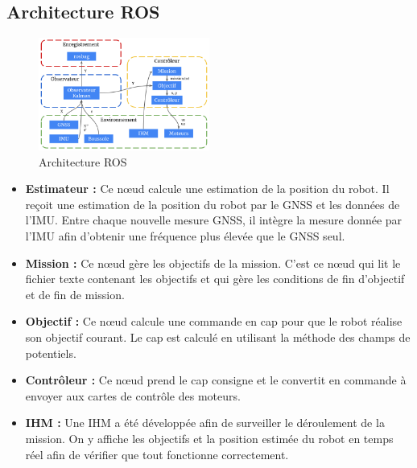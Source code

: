 \subsection{Architecture ROS}

\begin{figure}[H]
    \centering\includegraphics[width=0.5\textwidth]{images/ugv/arch_ros.png}
    \caption{Architecture ROS}
\end{figure}

\begin{itemize}
    \item \textbf{Estimateur :}
    Ce nœud calcule une estimation de la position du robot. Il reçoit une estimation de la position du robot par le GNSS et les données de l’IMU. Entre chaque nouvelle mesure GNSS, il intègre la mesure donnée par l’IMU afin d’obtenir une fréquence plus élevée que le GNSS seul.
    \\
    \item \textbf{Mission :}
    Ce nœud gère les objectifs de la mission. C’est ce nœud qui lit le fichier texte contenant les objectifs et qui gère les conditions de fin d’objectif et de fin de mission.
    \\
    \item \textbf{Objectif :}
    Ce nœud calcule une commande en cap pour que le robot réalise son objectif courant. Le cap est calculé en utilisant la méthode des champs de potentiels.
    \\
    \item \textbf{Contrôleur :}
    Ce nœud prend le cap consigne et le convertit en commande à envoyer aux cartes de contrôle des moteurs.
    \\
    \item \textbf{IHM :}
    Une IHM a été développée afin de surveiller le déroulement de la mission. On y affiche les objectifs et la position estimée du robot en temps réel afin de vérifier que tout fonctionne correctement.
\end{itemize}